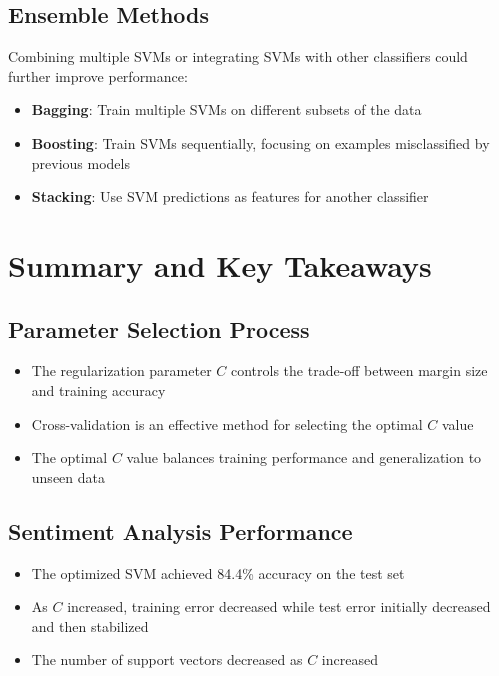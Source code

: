 \documentclass{article}
\begin{document}
\subsection{Ensemble Methods}
Combining multiple SVMs or integrating SVMs with other classifiers could further improve performance:

\begin{itemize}
    \item \textbf{Bagging}: Train multiple SVMs on different subsets of the data
    \item \textbf{Boosting}: Train SVMs sequentially, focusing on examples misclassified by previous models
    \item \textbf{Stacking}: Use SVM predictions as features for another classifier
\end{itemize}

\section{Summary and Key Takeaways}

\subsection{Parameter Selection Process}
\begin{itemize}
    \item The regularization parameter $C$ controls the trade-off between margin size and training accuracy
    \item Cross-validation is an effective method for selecting the optimal $C$ value
    \item The optimal $C$ value balances training performance and generalization to unseen data
\end{itemize}

\subsection{Sentiment Analysis Performance}
\begin{itemize}
    \item The optimized SVM achieved 84.4\% accuracy on the test set
    \item As $C$ increased, training error decreased while test error initially decreased and then stabilized
    \item The number of support vectors decreased as $C$ increased
\end{itemize}
\end{document}
